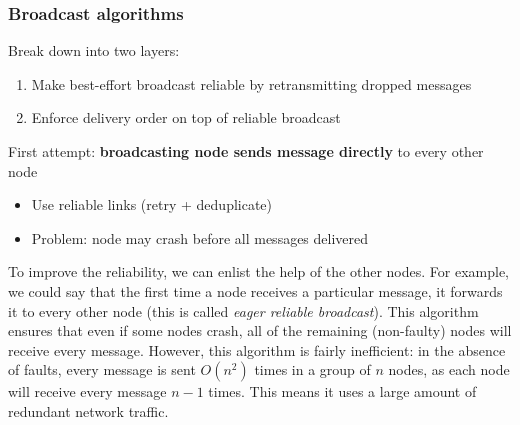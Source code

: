 \begin{frame}
    \label{s:broadcast-alg}
    \frametitle{Broadcast algorithms}
    Break down into two layers:
    \begin{enumerate}
        \item Make best-effort broadcast reliable by retransmitting dropped messages
        \item Enforce delivery order on top of reliable broadcast\\[1em]
    \end{enumerate}\pause
    First attempt: \textbf{broadcasting node sends message directly} to every other node
    \begin{itemize}
        \item Use reliable links (retry + deduplicate)\pause
        \item Problem: node may crash before all messages delivered\\[1em]
    \end{itemize}
    \begin{center}
    \end{center}%
\end{frame}
\label{l:broadcast-alg}

To improve the reliability, we can enlist the help of the other nodes.
For example, we could say that the first time a node receives a particular message, it forwards it to every other node (this is called \emph{eager reliable broadcast}).
This algorithm ensures that even if some nodes crash, all of the remaining (non-faulty) nodes will receive every message.
However, this algorithm is fairly inefficient: in the absence of faults, every message is sent $O(n^2)$ times in a group of $n$ nodes, as each node will receive every message $n-1$ times.
This means it uses a large amount of redundant network traffic.

